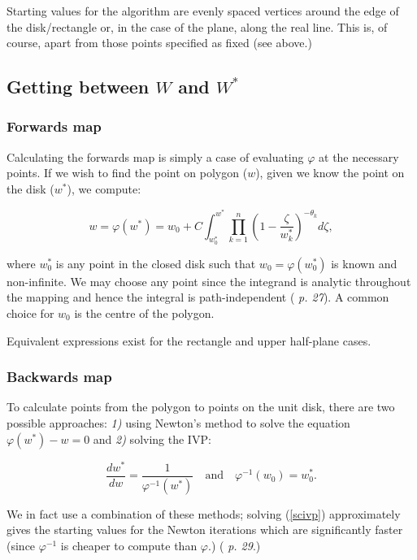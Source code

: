 \documentclass[a4paper,10pt]{amsart}
\newcommand{\phiinv}{\phi^{-1}}
\renewcommand{\phi}{\varphi}
\begin{document}
Starting values for the algorithm are evenly spaced vertices around the edge of the disk/rectangle or, in the case of the plane, along the real line. This is, of course, apart from those points specified as fixed (see above.)

\subsection{Getting between $W$ and $W^*$}

\subsubsection{Forwards map}

Calculating the forwards map is simply a case of evaluating $\phi$ at the necessary points. If we wish to find the point on polygon ($w$), given we know the point on the disk ($w^*$), we compute:

\begin{equation}
\label{forwardsmap}
w=\phi(w^*) = w_0 + C \int_{w^*_0}^{w^*} \prod_{k=1}^{n} (1 - \frac{\zeta}{w^*_k})^{-\theta_k} d\zeta,
\end{equation}

where $w^*_0$ is any point in the closed disk such that $w_0 = \phi(w^*_0)$ is known and non-infinite. We may choose any point since the integrand is analytic throughout the mapping and hence the integral is path-independent (\cite{driscoll} \emph{p. 27}). A common choice for $w_0$ is the centre of the polygon.

Equivalent expressions exist for the rectangle and upper half-plane cases.


\subsubsection{Backwards map}

To calculate points from the polygon to points on the unit disk, there are two possible approaches: \emph{1)} using Newton's method to solve the equation $\phi(w^*)-w=0$ and \emph{2)} solving the IVP:

\begin{equation}
\label{scivp}
\frac{dw^*}{dw}=\frac{1}{\phi^{-1}(w^*)} \quad \text{and} \quad \phiinv(w_0)=w^*_0.
\end{equation}

We in fact use a combination of these methods; solving (\ref{scivp}) approximately gives the starting values for the Newton iterations which are significantly faster (since $\phi^{-1}$ is cheaper to compute than $\phi$.) (\cite{driscoll} \emph{p. 29}.)
\end{document}
